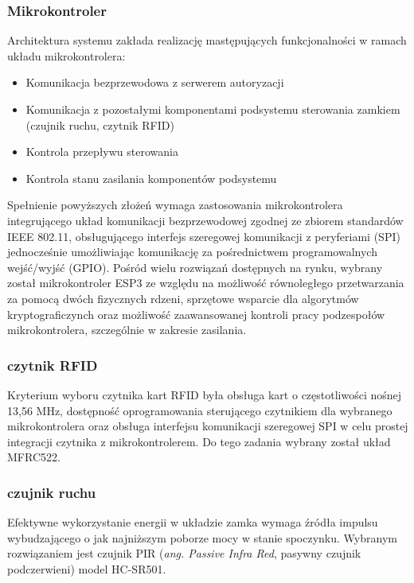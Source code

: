         \subsubsection{Mikrokontroler}

            Architektura systemu zakłada realizację mastępujących funkcjonalności w ramach układu mikrokontrolera:
            \begin{itemize}
                \item Komunikacja bezprzewodowa z serwerem autoryzacji
                \item Komunikacja z pozostałymi komponentami podsystemu sterowania zamkiem (czujnik ruchu, czytnik RFID)
                \item Kontrola przepływu sterowania
                \item Kontrola stanu zasilania komponentów podsystemu
            \end{itemize}
            Spełnienie powyższych złożeń wymaga zastosowania mikrokontrolera integrującego układ komunikacji bezprzewodowej zgodnej ze zbiorem standardów IEEE 802.11, obsługującego interfejs szeregowej komunikacji z peryferiami (SPI) jednocześnie umożliwiając komunikację za pośrednictwem programowalnych wejść/wyjść (GPIO). Pośród wielu rozwiązań  dostępnych na rynku, wybrany został mikrokontroler ESP3 ze względu na możliwość równoległego przetwarzania za pomocą dwóch fizycznych rdzeni, sprzętowe wsparcie dla algorytmów kryptograficzynch oraz możliwość zaawansowanej kontroli pracy podzespołów mikrokontrolera, szczególnie w zakresie zasilania.

        \subsubsection{czytnik RFID}

            Kryterium wyboru czytnika kart RFID była obsługa kart o częstotliwości nośnej 13,56 MHz, dostępność oprogramowania sterującego czytnikiem dla wybranego mikrokontrolera oraz obsługa interfejsu komunikacji szeregowej SPI w celu prostej integracji czytnika z mikrokontrolerem. Do tego zadania wybrany został układ MFRC522.

        \subsubsection{czujnik ruchu}

            Efektywne wykorzystanie energii w układzie zamka wymaga źródła impulsu wybudzającego o jak najniższym poborze mocy w stanie spoczynku. Wybranym rozwiązaniem jest czujnik PIR (\textit{ang. Passive Infra Red}, pasywny czujnik podczerwieni) model HC-SR501.

